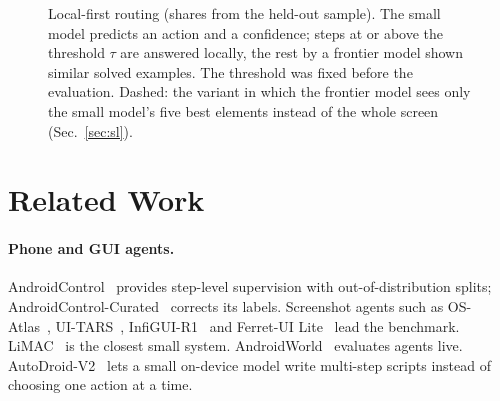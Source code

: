 \documentclass[10pt]{article}
\begin{document}
\begin{figure}[t]
\centering
{}
\caption{Local-first routing (shares from the held-out sample). The small model predicts an action and a confidence; steps at or above the threshold $\tau$ are answered locally, the rest by a frontier model shown similar solved examples. The threshold was fixed before the evaluation. Dashed: the variant in which the frontier model sees only the small model's five best elements instead of the whole screen (Sec.~\ref{sec:sl}).}\label{fig:overview}
\end{figure}

\section{Related Work}
\paragraph{Phone and GUI agents.} AndroidControl~\citep{androidcontrol} provides step-level supervision with out-of-distribution splits; AndroidControl-Curated~\citep{accurated} corrects its labels. Screenshot agents such as OS-Atlas~\citep{osatlas}, UI-TARS~\citep{uitars}, InfiGUI-R1~\citep{infiguir1} and Ferret-UI Lite~\citep{ferretlite} lead the benchmark. LiMAC~\citep{limac} is the closest small system. AndroidWorld~\citep{androidworld} evaluates agents live. AutoDroid-V2~\citep{autodroidv2} lets a small on-device model write multi-step scripts instead of choosing one action at a time.
\end{document}
